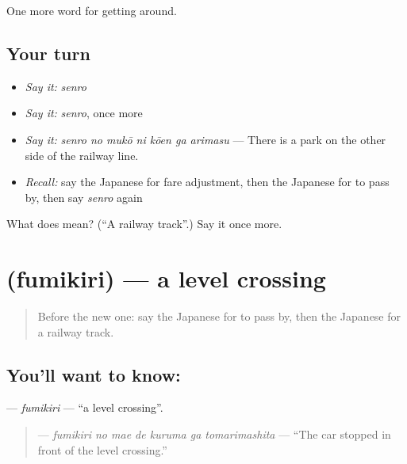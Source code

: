 \begin{grammarlens}[title={What you've built}]
One more word for getting around.
\end{grammarlens}

\subsection*{Your turn}
\begin{itemize}
\raggedright
  \item \emph{Say it:} \emph{senro}
  \item \emph{Say it:} \emph{senro}, once more
  \item \emph{Say it:} \emph{senro no mukō ni kōen ga arimasu} — There is a park on the other side of the railway line.
  \item \emph{Recall:} say the Japanese for fare adjustment, then the Japanese for to pass by, then say \emph{senro} again
\end{itemize}

\begin{tcolorbox}[breakable,colback=teal!4,colframe=teal!35!black,title={Before you move on}]
What does  mean? (\textquotedblleft{}A railway track\textquotedblright{}.) Say it once more.
\end{tcolorbox}
\section[\texorpdfstring{\ja{ふみきり} (fumikiri)}{ふみきり (fumikiri)}]{ (fumikiri) — a level crossing}

\label{lesson:JA-C374-fumikiri}



\begin{quote}
Before the new one: say the Japanese for to pass by, then the Japanese for a railway track.
\end{quote}

\subsection*{You'll want to know: }
\textbf{} — \emph{fumikiri} — \textquotedblleft{}a level crossing\textquotedblright{}.

\begin{quote}
\textbf{   } — \emph{fumikiri no mae de kuruma ga tomarimashita} — \textquotedblleft{}The car stopped in front of the level crossing.\textquotedblright{}
\end{quote}

